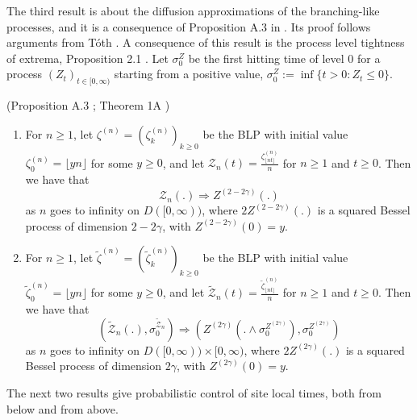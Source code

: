 \documentclass[EJP]{ejpecp} %
\begin{document}
The third result is about the diffusion approximations of the branching-like processes, and it is a consequence of Proposition A.3 in \cite{KMP23}. Its proof follows arguments from T\'{o}th \cite{T96}. A consequence of this result is the process level tightness of extrema, Proposition 2.1 \cite{KMP23}. 
Let $\sigma_0^Z$ be the first hitting time of level $0$ for a process $\left( Z_t \right) _{t \in [0,\infty )}$ starting from a positive value, $\sigma_0^Z := \inf \{t>0: Z_t \le 0\} $.
\begin{lemma}(Proposition A.3 \cite{KMP23}; Theorem 1A \cite{T96})\label{lm: diffusion approximation of blp}
	\begin{enumerate}
		\item 
		For $n\geq 1$, let $\zeta^{(n)}=(\zeta^{(n)}_k)_{k\geq 0 }  $ be the BLP with initial value $\zeta^{(n)}_0 = \lfloor yn \rfloor$ for some $y \geq 0$, and let $\mathcal{Z}_n(t) = \frac{\zeta^{(n)}_{\lfloor nt \rfloor}}{n}$ for $n\geq 1$ and $t\geq 0$. Then we have that 
		\[
		\mathcal{Z}_n(.) \Longrightarrow Z^{(2-2\gamma)}(.)
		\] 
		as $n$ goes to infinity on $D([0,\infty))$, where $2Z^{(2-2\gamma)}(.)$ is a squared Bessel process of dimension $2-2\gamma$, with $Z^{(2 - 2 \gamma)}(0) = y$.
		
		\item
		For $n\geq 1$, let $\tilde\zeta^{(n)}=(\tilde\zeta^{(n)}_k)_{k\geq 0 }  $ be the BLP with initial value $\tilde\zeta^{(n)}_0 = \lfloor yn \rfloor$ for some $y \geq 0$, and let $\tilde{\mathcal{Z}}_n(t) = \frac{\tilde\zeta^{(n)}_{\lfloor nt \rfloor}}{n}$ for $n\geq 1$ and $t\geq 0$. Then we have that 
		\[
		\left(\tilde{\mathcal{Z}}_n(.), \sigma_0^{\tilde{\mathcal{Z}}_n}\right) 
		\Longrightarrow \left(Z^{(2\gamma)}(. \wedge \sigma_0^{Z^{(2 \gamma)}}), \sigma_0^{Z^{(2 \gamma)}}\right)
		\]
		as $n$ goes to infinity on $D([0,\infty)) \times [0,\infty )$, where $2Z^{(2\gamma)}(.)$ is a squared Bessel process of dimension $2\gamma$, with $Z^{( 2 \gamma)}(0) = y$.
	\end{enumerate}
	
	
\end{lemma}


The next two results give probabilistic control of site local times, both from below and from above.
\end{document}
